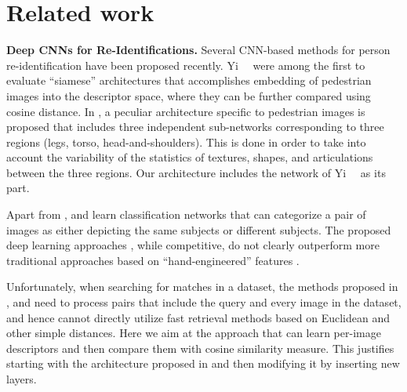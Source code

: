 \section{Related work}

\textbf{Deep CNNs for Re-Identifications.} Several CNN-based methods for person re-identification have been proposed recently\cite{li2014deepreid, yi2014deep, ahmed2015improved, chen2015deep, VariorHW16, VariorSLXW16,SuZX0T16, LiuFQJY17, XiaoLOW16}. Yi~\etal~\cite{yi2014deep} were among the first to evaluate ``siamese'' architectures that accomplishes embedding of pedestrian images into the descriptor space, where they can be further compared using cosine distance. In \cite{yi2014deep}, a peculiar architecture specific to pedestrian images is proposed that includes three independent sub-networks corresponding to three regions (legs, torso, head-and-shoulders). This is done in order to take into account the variability of the statistics of textures, shapes, and articulations between the three regions. Our architecture includes the network of  Yi~\etal~\cite{yi2014deep} as its part.

Apart from \cite{yi2014deep}, \cite{li2014deepreid} and \cite{ahmed2015improved} learn classification networks that can categorize a pair of images as either depicting  the same subjects or different subjects. %
The proposed deep learning approaches \cite{ahmed2015improved, yi2014deep, li2014deepreid}, while competitive, do not clearly outperform more traditional approaches based on ``hand-engineered'' features \cite{paisitkriangkrai2015learning, zhao2014person}.

Unfortunately, when searching for matches in a dataset, the methods proposed in \cite{li2014deepreid}, \cite{ahmed2015improved} and \cite{chen2015deep} need to process pairs that include the query and every image in the dataset, and hence cannot directly utilize fast retrieval methods based on Euclidean and other simple distances. Here we aim at the approach that can learn per-image descriptors and then compare them with cosine similarity measure. This justifies starting with the architecture proposed in  \cite{yi2014deep} and then modifying it by inserting new layers.

